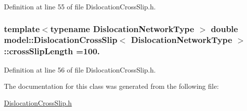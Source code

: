 Definition at line 55 of file Dislocation\+Cross\+Slip.\+h.

\hypertarget{classmodel_1_1_dislocation_cross_slip_aff2bffb9ba2b71f6bcefebfd84057b3f}{}
\subsubsection[{cross\+Slip\+Length}]{\setlength{\rightskip}{0pt plus 5cm}template$<$typename Dislocation\+Network\+Type $>$ double {\bf model\+::\+Dislocation\+Cross\+Slip}$<$ Dislocation\+Network\+Type $>$\+::cross\+Slip\+Length =100.\hspace{0.3cm}{\ttfamily [static]}}\label{classmodel_1_1_dislocation_cross_slip_aff2bffb9ba2b71f6bcefebfd84057b3f}


Definition at line 56 of file Dislocation\+Cross\+Slip.\+h.



The documentation for this class was generated from the following file\+:\begin{DoxyCompactItemize}
\item 
\hyperlink{_dislocation_cross_slip_8h}{Dislocation\+Cross\+Slip.\+h}\end{DoxyCompactItemize}
